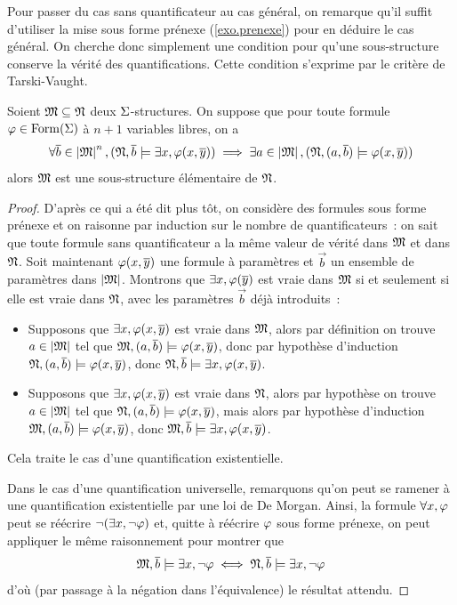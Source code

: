 Pour passer du cas sans quantificateur au cas général, on remarque qu'il suffit
d'utiliser la mise sous forme prénexe (\cref{exo.prenexe}) pour en déduire le
cas général. On cherche donc simplement une condition pour qu'une sous-structure
conserve la vérité des quantifications. Cette condition s'exprime par le
critère de Tarski-Vaught.

\begin{theorem}
  \label{thm.tarski.vaught}
  Soient $\mathfrak{M}\subseteq\mathfrak{N}$ deux $\Sigma$-structures. On suppose que pour
  toute formule $\varphi\in\operatorname{Form}(\Sigma)$ à $n+1$ variables libres, on a
  \[\forall \overline{b} \in \left\vert \mathfrak{M}\right\vert^n,
  (\mathfrak{N},\overline{b} \models \exists x,\varphi(x,\overline{y}))\implies
  \exists a \in \left\vert \mathfrak{M}\right\vert, (\mathfrak{N},(a,\overline{b})\models \varphi(x,\overline{y}))\]
  alors $\mathfrak{M}$ est une sous-structure élémentaire de $\mathfrak{N}$.
\end{theorem}

\begin{proof}
  D'après ce qui a été dit plus tôt, on considère des formules sous forme
  prénexe et on raisonne par induction sur le nombre de quantificateurs~: on
  sait que toute formule sans quantificateur a la même valeur de vérité dans
  $\mathfrak{M}$ et dans $\mathfrak{N}$. Soit maintenant $\varphi(x,\overline{y})$ une formule à
  paramètres et $\vec b$ un ensemble de paramètres dans $\left\vert \mathfrak{M}\right\vert$. Montrons que
  $\exists x,\varphi(\overline{y})$ est vraie dans $\mathfrak{M}$ si et seulement si elle est
  vraie dans $\mathfrak{N}$, avec les paramètres $\vec b$ déjà introduits~:
  \begin{itemize}
  \item[\fbox{$\Rightarrow$}] Supposons que $\exists x, \varphi(x,\overline{y})$ est
    vraie dans $\mathfrak{M}$, alors par définition on trouve $a \in\left\vert \mathfrak{M}\right\vert$ tel
    que $\mathfrak{M},(a,\overline{b})\models\varphi(x,\overline{y})$, donc par hypothèse
    d'induction $\mathfrak{N},(a,\overline{b})\models\varphi(x,\overline{y})$, donc
    $\mathfrak{N},\overline{b}\models\exists x,\varphi(x,\overline{y})$.
  \item[\fbox{$\Leftarrow$}] Supposons que $\exists x,\varphi(x,\overline{y})$ est
    vraie dans $\mathfrak{N}$, alors par hypothèse on trouve $a\in\left\vert \mathfrak{M}\right\vert$ tel
    que $\mathfrak{N},(a,\overline{b})\models\varphi(x,\overline{y})$, mais alors par hypothèse
    d'induction $\mathfrak{M},(a,\overline{b})\models\varphi(x,\overline{y})$, donc
    $\mathfrak{M},\overline{b}\models\exists x,\varphi(x,\overline{y})$.
  \end{itemize}
  Cela traite le cas d'une quantification existentielle.

  Dans le cas d'une quantification universelle, remarquons qu'on peut se
  ramener à une quantification existentielle par une loi de De Morgan. Ainsi,
  la formule $\forall x, \varphi$ peut se réécrire $\lnot(\exists x,\lnot\varphi)$
  et, quitte à réécrire $\varphi$ sous forme prénexe, on peut appliquer le même
  raisonnement pour montrer que
  \[\mathfrak{M},\overline{b}\models \exists x,\lnot\varphi\iff
  \mathfrak{N},\overline{b}\models\exists x,\lnot\varphi\]
  d'où (par passage à la négation dans l'équivalence) le résultat attendu.
\end{proof}

